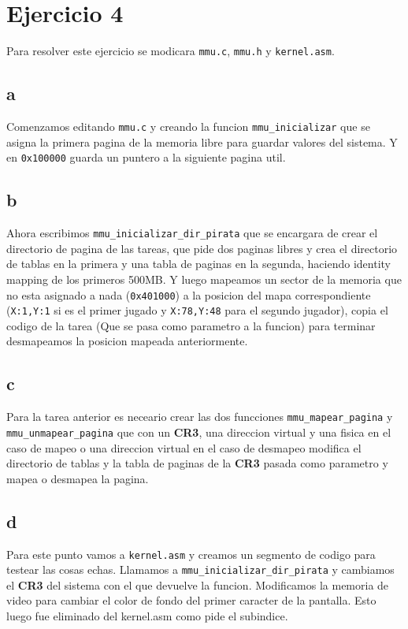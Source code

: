 \section{Ejercicio 4}

Para resolver este ejercicio se modicara \texttt{mmu.c}, \texttt{mmu.h} y \texttt{kernel.asm}.

\subsection{a}
Comenzamos editando \texttt{mmu.c} y creando la funcion \texttt{mmu\_inicializar} que se asigna la primera pagina de la memoria libre para guardar valores del sistema. Y en \texttt{0x100000} guarda un puntero a la siguiente pagina util.

\subsection{b}
Ahora escribimos \texttt{mmu\_inicializar\_dir\_pirata} que se encargara de crear el directorio de pagina de las tareas, que pide dos paginas libres y crea el directorio de tablas en la primera y una tabla de paginas en la segunda, haciendo identity mapping de los primeros 500MB. Y luego mapeamos un sector de la memoria que no esta asignado a nada (\texttt{0x401000}) a la posicion del mapa correspondiente (\texttt{X:1,Y:1} si es el primer jugado y \texttt{X:78,Y:48} para el segundo jugador), copia el codigo de la tarea (Que se pasa como parametro a la funcion) para terminar desmapeamos la posicion mapeada anteriormente.

\subsection{c}
Para la tarea anterior es neceario crear las dos funcciones \texttt{mmu\_mapear\_pagina} y \texttt{mmu\_unmapear\_pagina} que con un \textbf{CR3}, una direccion virtual y una fisica en el caso de mapeo o una direccion virtual en el caso de desmapeo modifica el directorio de tablas y la tabla de paginas de la \textbf{CR3} pasada como parametro y mapea o desmapea la pagina.

\subsection{d}
Para este punto vamos a \texttt{kernel.asm} y creamos un segmento de codigo para testear las cosas echas. Llamamos a \texttt{mmu\_inicializar\_dir\_pirata} y cambiamos el \textbf{CR3} del sistema con el que devuelve la funcion. Modificamos la memoria de video para cambiar el color de fondo del primer caracter de la pantalla. Esto luego fue eliminado del kernel.asm como pide el subindice.